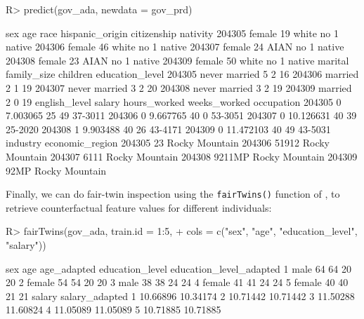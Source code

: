 \documentclass[
  nojss]{jss}
\begin{document}
\begin{CodeChunk}
\begin{CodeInput}
R> predict(gov_ada, newdata = gov_prd)
\end{CodeInput}
\begin{CodeOutput}
          sex age  race hispanic_origin citizenship nativity
204305 female  19 white              no           1   native
204306 female  46 white              no           1   native
204307 female  24  AIAN              no           1   native
204308 female  23  AIAN              no           1   native
204309 female  50 white              no           1   native
             marital family_size children education_level
204305 never married           5        2              16
204306       married           2        1              19
204307 never married           3        2              20
204308 never married           3        2              19
204309       married           2        0              19
       english_level    salary hours_worked weeks_worked occupation
204305             0  7.003065           25           49    37-3011
204306             0  9.667765           40            0    53-3051
204307             0 10.126631           40           39    25-2020
204308             1  9.903488           40           26    43-4171
204309             0 11.472103           40           49    43-5031
       industry economic_region
204305       23  Rocky Mountain
204306    51912  Rocky Mountain
204307     6111  Rocky Mountain
204308   9211MP  Rocky Mountain
204309     92MP  Rocky Mountain
\end{CodeOutput}
\end{CodeChunk}

Finally, we can do fair-twin inspection using the \texttt{fairTwins()}
function of , to retrieve counterfactual feature values
for different individuals:

\begin{CodeChunk}
\begin{CodeInput}
R> fairTwins(gov_ada, train.id = 1:5,
+           cols = c("sex", "age", "education_level", "salary"))
\end{CodeInput}
\begin{CodeOutput}
     sex age age_adapted education_level education_level_adapted
1   male  64          64              20                      20
2 female  54          54              20                      20
3   male  38          38              24                      24
4 female  41          41              24                      24
5 female  40          40              21                      21
    salary salary_adapted
1 10.66896       10.34174
2 10.71442       10.71442
3 11.50288       11.60824
4 11.05089       11.05089
5 10.71885       10.71885
\end{CodeOutput}
\end{CodeChunk}
\end{document}
